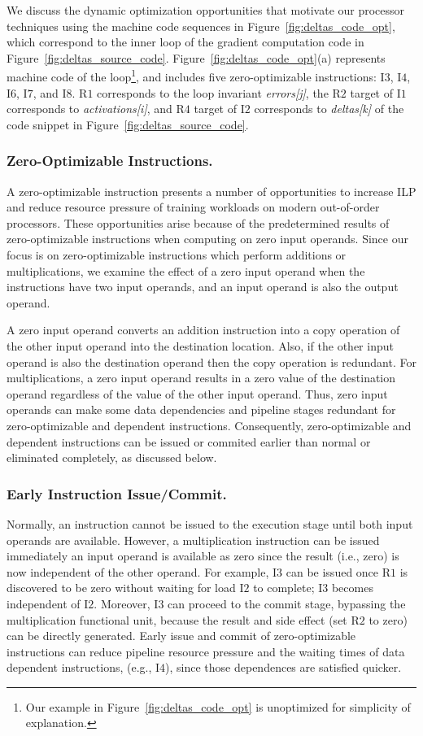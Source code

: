 We discuss the dynamic optimization opportunities that motivate our processor techniques using the machine code sequences in Figure~\ref{fig:deltas_code_opt}, which correspond to the inner loop of the gradient computation code in Figure~\ref{fig:deltas_source_code}.    Figure~\ref{fig:deltas_code_opt}(a) represents machine code of the loop\footnote{Our example in Figure~\ref{fig:deltas_code_opt} is unoptimized for simplicity of explanation.}, and includes five zero-optimizable instructions: I$3$, I$4$, I$6$, I$7$, and I$8$.  
R$1$ corresponds to the loop invariant \emph{errors[j]}, the R$2$ target of I$1$ corresponds to \emph{activations[i]}, and R$4$ target of I$2$ corresponds to \emph{deltas[k]} of the code snippet in Figure~\ref{fig:deltas_source_code}.

\subsubsection{Zero-Optimizable Instructions.} A zero-optimizable instruction presents a number of opportunities to increase ILP and reduce resource pressure of training workloads on modern out-of-order processors.  These opportunities arise because of the predetermined results of zero-optimizable instructions when computing on zero input operands.  Since our focus is on zero-optimizable instructions which perform additions or multiplications, we examine the effect of a zero input operand when the instructions have two input operands, and an input operand is also the output operand. 

A zero input operand converts an addition instruction into a copy operation of the other input operand into the destination location. Also, if the other input operand is also the destination operand then the copy operation is redundant.  For multiplications, a zero input operand results in a zero value of the destination operand regardless of the value of the other input operand.  Thus, zero input operands can make some data dependencies and pipeline stages redundant for zero-optimizable and dependent instructions.  Consequently, zero-optimizable and dependent instructions can be issued or commited earlier than normal or eliminated completely, as discussed below. 

\subsubsection{Early Instruction Issue/Commit.}  Normally, an instruction cannot be issued to the execution stage until both input operands are available. However, a multiplication instruction can be issued immediately an input operand is available as zero since the result (i.e., zero) is now independent of the other operand.  For example, I$3$ can be issued once R$1$ is discovered to be zero without waiting for load I$2$ to complete; I$3$ becomes independent of I$2$.  Moreover, I$3$ can proceed to the commit stage, bypassing the multiplication functional unit, because the result and side effect (set R$2$ to zero)  can be directly generated.  Early issue and commit of zero-optimizable instructions can reduce pipeline resource pressure and the waiting times of data dependent instructions, (e.g., I$4$), since those dependences are satisfied quicker. 


